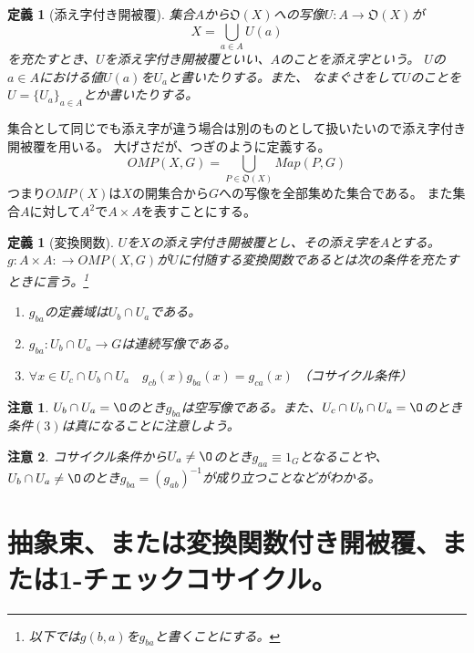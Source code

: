 \documentclass[leqno]{jsarticle}
\newtheorem{df}[thm]{定義}
\newtheorem*{cau}{注意}
\begin{document}
\begin{df}[添え字付き開被覆]
集合$A$から$\mathfrak{O}(X)$への写像$U:A\to \mathfrak{O}(X)$が
\[
X=\bigcup_{a\in A}U(a)
\]
を充たすとき、$U$を添え字付き開被覆といい、$A$のことを添え字という。
$U$の$a\in A$における値$U(a)$を$U_a$と書いたりする。また、
なまぐさをして$U$のことを$U=\{U_a\}_{a\in A}$とか書いたりする。
\end{df}
集合として同じでも添え字が違う場合は別のものとして扱いたいので添え字付き開被覆を用いる。
大げさだが、つぎのように定義する。
\[
OMP(X,G)=\bigcup_{P\in \mathfrak{O}(X)}Map(P, G)
\]
つまり$OMP(X)$は$X$の開集合から$G$への写像を全部集めた集合である。
また集合$A$に対して$A^2$で$A\times A$を表すことにする。
\begin{df}[変換関数]
$U$を$X$の添え字付き開被覆とし、その添え字を$A$とする。$g:A\times A:\to OMP(X,G)$が$U$に付随する変換関数であるとは次の条件を充たすときに言う。\footnote{以下では$g(b,a)$を$g_{ba}$と書くことにする。}
\begin{enumerate}
\item $g_{ba}$の定義域は$U_{b}\cap U_{a}$である。
\item $g_{ba}: U_b\cap U_a\to G$は連続写像である。
\item $\forall x\in U_c\cap U_b\cap U_a\quad g_{cb}(x)g_{ba}(x)=g_{ca}(x)$ （コサイクル条件）
\end{enumerate}
\end{df}
\begin{cau}
$U_b\cap U_a=\O$のとき$g_{ba}$は空写像である。また、$U_c\cap U_b\cap U_a=\O$のとき条件$(3)$は真になることに注意しよう。
\end{cau}
\begin{cau}
コサイクル条件から$U_a\neq \O$のとき$g_{aa}\equiv 1_G$となることや、
$U_b\cap U_a\neq \O$のとき$g_{ba}=(g_{ab})^{-1}$が成り立つことなどがわかる。
\end{cau}
\section{抽象束、または変換関数付き開被覆、または1-チェックコサイクル。}
\end{document}
